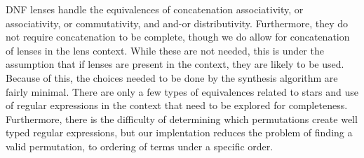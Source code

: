 DNF lenses handle the equivalences of concatenation associativity,
or associativity, or commutativity, and and-or distributivity.
Furthermore, they do not require concatenation to be complete,
though we do allow for concatenation of lenses in the lens context.
While these are not needed, this is under the assumption that if lenses are present
in the context, they are likely to be used.
Because of this, the choices needed to be done by the synthesis algorithm
are fairly minimal.  There are only
a few types of equivalences related to stars and use of regular expressions
in the context that need to be explored for completeness.
Furthermore, there is the difficulty of determining which permutations create
well typed regular expressions, but our implentation reduces the problem of
finding a valid permutation, to ordering of terms under a specific order.





